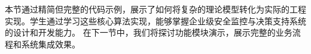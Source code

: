{{{{本节通过精简但完整的代码示例，展示了如何将复杂的理论模型转化为实际的工程实现。学生通过学习这些核心算法实现，能够掌握企业级安全监控与决策支持系统的设计和开发能力。 在下一节中，我们将探讨功能模块演示，展示完整的业务流程和系统集成效果。 \hypertarget{ux601dux8003ux9898ux4e0eux7ec3ux4e60}{%

}}}}}
